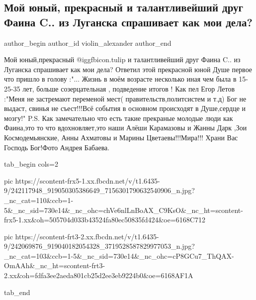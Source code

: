  
 
 
 
 
 
\subsection{Мой юный, прекрасный и талантливейший друг Фаина C.. из Луганска спрашивает как мои дела?}
\label{sec:15_09_2021.fb.violin_alexander.1.savenkova_kak_dela}
 
\ifcmt
 author_begin
   author_id violin_alexander
 author_end
\fi

Мой юный,прекрасный @igg{fbicon.tulip}  и талантливейший друг Фаина C.. из Луганска спрашивает как
мои дела? Ответил этой прекрасной юной Душе первое что пришло в голову :"...
Жизнь в моём возрасте несколько иная чем была в 15-25-35 лет, больше
созерцательная , подведение итогов ! Как пел Егор Летов :"Меня не застремают
переменой мест( правительств,политсистем и т.д) Бог не выдаст, свинья не
съест!!!Всё события в основном происходят в Душе,сердце и мозгу!" P.S. Как
замечательно что есть такие прекраные молодые люди как Фаина,это то что
вдохновляет,это наши Алёши Карамазовы и Жанны Дарк ,Зои Космодемьянские, Анны
Ахматовы и Марины Цветаевы!!!Мира!!! Храни Вас Господь Бог!Фото Андрея Бабаева.

\ifcmt
  tab_begin cols=2

     pic https://scontent-frx5-1.xx.fbcdn.net/v/t1.6435-9/242117948_919050305386649_7156301790632540906_n.jpg?_nc_cat=110&ccb=1-5&_nc_sid=730e14&_nc_ohc=chVe6nlLnBoAX_C9KsO&_nc_ht=scontent-frx5-1.xx&oh=505704d033b43524fa80ec50835fd424&oe=6168C712

     pic https://scontent-frt3-2.xx.fbcdn.net/v/t1.6435-9/242069876_919040182054328_3719528587829977053_n.jpg?_nc_cat=103&ccb=1-5&_nc_sid=730e14&_nc_ohc=cP8GCu7_ThQAX-OmAAh&_nc_ht=scontent-frt3-2.xx&oh=fdfa3ee2aeda801cb25d2ee3eb9224b0&oe=6168AF1A

  tab_end
\fi
